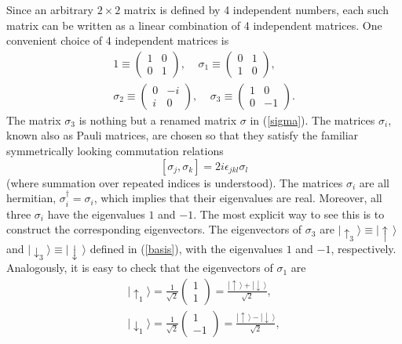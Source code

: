 \documentclass[12pt]{article}
\begin{document}
Since an arbitrary $2\times 2$ matrix is defined by 4 independent 
numbers, each such matrix can be written as a linear combination 
of 4 independent matrices. One convenient choice of 4 independent 
matrices is
\begin{eqnarray}\label{pauli}    
&
1 \equiv \left( \begin{array}{cc}
1 & 0 \\
0 & 1
\end{array} \right) , \;\;\;\;
\sigma_1 \equiv \left( \begin{array}{cc}
0 & 1 \\
1 & 0
\end{array} \right) , & \nonumber \\
&
\sigma_2 \equiv \left( \begin{array}{cc}
0 & -i \\
i & 0
\end{array} \right) , \;\;\;\;
\sigma_3 \equiv \left( \begin{array}{cc}
1 & 0 \\
0 & -1
\end{array} \right) . &
\end{eqnarray}
The matrix $\sigma_3$ is nothing but a renamed matrix $\sigma$ in
(\ref{sigma}). The matrices $\sigma_i$, known also 
as Pauli matrices, are chosen so that they satisfy 
the familiar symmetrically looking commutation relations 
\begin{equation}\label{comsig}
[\sigma_j,\sigma_k]=2i\epsilon_{jkl}\sigma_l  
\end{equation}
(where summation over repeated indices is understood).
The matrices $\sigma_i$ are all hermitian, 
$\sigma_i^{\dagger}=\sigma_i$, which implies that their eigenvalues 
are real. Moreover, all three $\sigma_i$ have the eigenvalues 
$1$ and $-1$. The most explicit way to see this is to construct 
the corresponding eigenvectors. The eigenvectors of 
$\sigma_3$ are $|\!\uparrow_3\rangle \equiv |\!\uparrow\,\rangle$ 
and $|\!\downarrow_3\rangle \equiv |\!\downarrow\,\rangle$
defined in (\ref{basis}), with the eigenvalues $1$ and $-1$, respectively.
Analogously, it is easy to check that the eigenvectors of $\sigma_1$ are
\begin{eqnarray}\label{basis1}
& |\!\uparrow_1\rangle=\frac{1}{\sqrt{2}}
\left( \begin{array}{c} 1 \\ 
                        1 \end{array} \right)=
\displaystyle\frac{ 
|\!\uparrow\,\rangle + |\!\downarrow\,\rangle }{\sqrt{2}} , &
\nonumber \\
& |\!\downarrow_1\rangle=\frac{1}{\sqrt{2}}
\left( \begin{array}{c} 1 \\ 
                        -1 \end{array} \right)=
\displaystyle\frac{
|\!\uparrow\,\rangle - |\!\downarrow\,\rangle }{\sqrt{2}} , &
\end{eqnarray}
\end{document}
